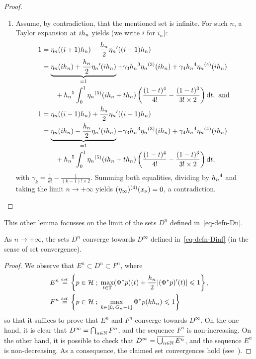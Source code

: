 \begin{proof}
\begin{enumerate}
\item Assume, by contradiction, that the mentioned set is infinite. For such $n$, a Taylor expansion at $i{h_n}$ yields (we write $i$ for $i_n$):
\begin{align*}
  1&=\eta_n((i+1){h_n})-\frac{{h_n}}{2}{\eta_n}'((i+1){h_n})\\
   & =  \underbrace{\eta_n(i{h_n}) +\frac{{h_n}}{2}{\eta_n}'(i{h_n})}_{=1} + \gamma_3{h_n}^3 {\eta_n}^{(3)}(i{h_n})+ \gamma_4{h_n}^4 {\eta_n}^{(4)}(i{h_n})\\
   &\quad\quad+{h_n}^5\int_0^1 {\eta_n}^{(5)}(i{h_n}+t{h_n})\left(\frac{(1-t)^4}{4!} -\frac{(1-t)^3}{3!\times 2}\right)\mathrm{d} t, \mbox{ and }\\
  1&= \eta_n((i-1){h_n})+\frac{{h_n}}{2}{\eta_n}'((i-1){h_n})\\
   & =  \underbrace{\eta_n(i{h_n}) -\frac{{h_n}}{2}{\eta_n}'(i{h_n})}_{=1} - \gamma_3{h_n}^3 {\eta_n}^{(3)}(i{h_n})+ \gamma_4{h_n}^4 {\eta_n}^{(4)}(i{h_n})\\
   &\quad \quad+  {h_n}^5\int_0^1 {\eta_n}^{(5)}(i{h_n}+t{h_n})\left(\frac{(1-t)^4}{4!} -\frac{(1-t)^3}{3!\times 2}\right)\mathrm{d} t,
\end{align*}
with $\gamma_k=\frac{1}{k!}- \frac{1}{(k-1)!\times 2}$. Summing both equalities, dividing by ${h_n}^4$ and taking the limit $n\to+\infty$ yields $(\eta_\infty)^{(4)}(x_\nu)=0$, a contradiction.
   \end{enumerate}
\end{proof}

This other lemma focusses on the limit of the sets $D^n$ defined in~\eqref{eq-defn-Dn}.

\begin{lem}
As $n\to+\infty$, the sets $D^n$ converge towards $D^\infty$ defined in~\eqref{eq-defn-Dinf} (in the sense of set convergence).
\label{lem-cbp-cvset}
\end{lem}
\begin{proof}
  We observe that $E^n \subset D^n\subset F^n$, where
  \begin{align*}
    E^n&\stackrel{\mbox{\upshape\tiny def.}}{=} \left\{ p\in \mathcal{H} \;;\; \max_{t\in \mathbb{T}}(\Phi^*p)(t)+\frac{{h_n}}{2}|(\Phi^*p)'(t)| \leqslant 1 \right\},\\
    F^n&\stackrel{\mbox{\upshape\tiny def.}}{=} \left\{ p\in \mathcal{H} \;;\; \max_{k\in\llbracket 0,\,{G_n}-1 \rrbracket}\Phi^*p(k{h_n})\leqslant 1 \right\}
  \end{align*}
so that it suffices to prove that $E^n$ and $F^n$ converge towards $D^\infty$. 
On the one hand, it is clear that $D^\infty=\bigcap_{n\in\mathbb{N}} F^n$, and the sequence $F^n$ is non-increasing.
On the other hand, it is possible to check that $D^\infty=\overline{\bigcup_{n\in \mathbb{N}}E^{n}}$, and the sequence $E^n$ is non-decreasing.
As a consequence, the claimed set convergences hold  (see~\cite[Ex. 4.3]{rockafellarwets}).
\end{proof}

